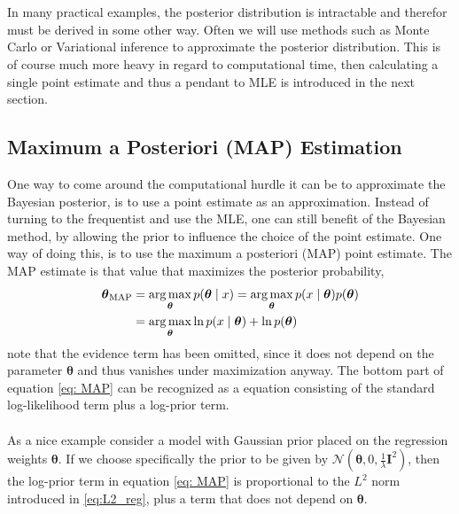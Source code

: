 \\
\\
In many practical examples, the posterior distribution is intractable and therefor must be derived in some other way. Often we will use methods such as Monte Carlo or Variational inference to approximate the posterior distribution. This is of course much more heavy in regard to computational time, then calculating a single point estimate and thus a pendant to MLE is introduced in the next section.



\subsection{Maximum a Posteriori (MAP) Estimation}
One way to come around the computational hurdle it can be to approximate the Bayesian posterior, is to use a point estimate as an approximation. Instead of turning to the frequentist and use the MLE, one can still benefit of the Bayesian method, by allowing the prior to influence the choice of the point estimate. One way of doing this, is to use the maximum a posteriori (MAP) point estimate. The MAP estimate is that value that maximizes the posterior probability,
\begin{equation}\label{eq: MAP}
  \begin{split}
        \boldsymbol{\theta}_{\text{MAP}}&=\operatorname*{arg\,max}_{\boldsymbol{\theta}}{p(\boldsymbol{\theta}\mid x})=\operatorname*{arg\,max}_{\boldsymbol{\theta}}{p(x\mid \boldsymbol{\theta}}) p(\boldsymbol{\theta})\\
        &=\operatorname*{arg\,max}_{\boldsymbol{\theta}}{\ln p(x\mid \boldsymbol{\theta}})+ \ln p(\boldsymbol{\theta})
  \end{split}
\end{equation}
note that the evidence term has been omitted, since it does not depend on the parameter $\boldsymbol{\theta}$ and thus vanishes under maximization anyway. The bottom part of equation \ref{eq: MAP} can be recognized as a equation consisting of the standard log-likelihood term plus a log-prior term. \\
\\
As a nice example consider a model with Gaussian prior placed on the regression weights $\boldsymbol{\theta}$. If we choose specifically the prior to be given by $\mathcal{N}\left(\boldsymbol{\theta},0,\frac{1}{\lambda}\boldsymbol{I}^2\right)$, then the log-prior term in equation \ref{eq: MAP} is proportional to the $L^2$ norm introduced in \ref{eq:L2_reg}, plus a term that does not depend on $\boldsymbol{\theta}$.
